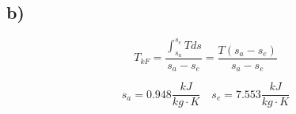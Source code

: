 

\subsection*{b)}

\[
T_{kF} = \frac{\int_{s_a}^{s_e} T ds}{s_a - s_e} = \frac{T \left( s_a - s_e \right)}{s_a - s_e}
\]

\[
s_a = 0.948 \frac{kJ}{kg \cdot K} \quad s_e = 7.553 \frac{kJ}{kg \cdot K}
\]